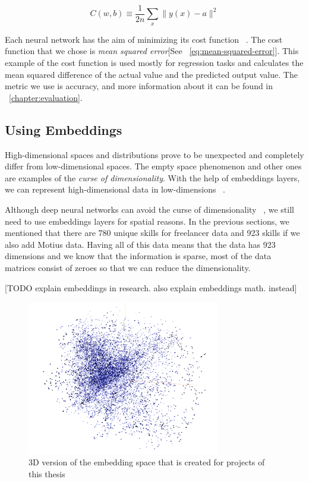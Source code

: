 \begin{equation}
C(w, b) \equiv \frac{1}{2 n} \sum_{x}\|y(x)-a\|^{2}
\label{eq:mean-squared-error}
\end{equation}

Each neural network has the aim of minimizing its cost function ~\parencite{Goodfellow-et-al-2016}. The cost function that we chose is \textit{mean squared error}[See ~\autoref{eq:mean-squared-error}]. This example of the cost function is used mostly for regression tasks and calculates the mean squared difference of the actual value and the predicted output value. The metric we use is accuracy, and more information about it can be found in ~\autoref{chapter:evaluation}.


\subsection{Using Embeddings}\label{subsection:using-embeddings}

High-dimensional spaces and distributions prove to be unexpected and completely differ from low-dimensional spaces. The empty space phenomenon and other ones are examples of the \textit{curse of dimensionality}. With the help of embeddings layers, we can represent high-dimensional data in low-dimensions  ~\parencite{lee2007nonlinear}.


Although deep neural networks can avoid the curse of dimensionality ~\parencite{poggio2017and}, we still need to use embeddings layers for spatial reasons. In the previous sections, we mentioned that there are 780 unique skills for freelancer data and 923 skills if we also add Motius data. Having all of this data means that the data has 923 dimensions and we know that the information is sparse, most of the data matrices consist of zeroes so that we can reduce the dimensionality. 

[TODO explain embeddings in research. also explain embeddings math. instead]
 \begin{figure}[!ht]
	\centering
	\includegraphics[width=0.75\textwidth]{figures/EmbeddingThesis.png}
	\caption{3D version of the embedding space that is created for projects of this thesis}
	\label{fig:embedding-projection}
\end{figure}


